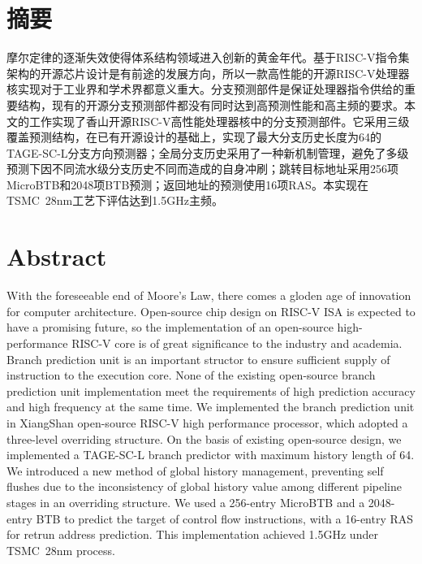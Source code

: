 \maketitle%
\intobmk\chapter*{摘\quad 要}%
\setcounter{page}{1}%
摩尔定律的逐渐失效使得体系结构领域进入创新的黄金年代\cite{hennessy2019new}。基于RISC-V指令集架构的开源芯片设计是有前途的发展方向，所以一款高性能的开源RISC-V处理器核实现对于工业界和学术界都意义重大。分支预测部件是保证处理器指令供给的重要结构，现有的开源分支预测部件都没有同时达到高预测性能和高主频的要求。本文的工作实现了香山开源RISC-V高性能处理器核中的分支预测部件。它采用三级覆盖预测结构，在已有开源设计的基础上，实现了最大分支历史长度为64的TAGE-SC-L分支方向预测器\cite{seznec2014tage}；全局分支历史采用了一种新机制管理，避免了多级预测下因不同流水级分支历史不同而造成的自身冲刷；跳转目标地址采用256项MicroBTB和2048项BTB预测；返回地址的预测使用16项RAS。本实现在TSMC~28nm工艺下评估达到1.5GHz主频。

\intobmk\chapter*{Abstract}%
With the foreseeable end of Moore's Law, there comes a gloden age of innovation for computer architecture\cite{hennessy2019new}. Open-source chip design on RISC-V ISA is expected to have a promising future, so the implementation of an open-source high-performance RISC-V core is of great significance to the industry and academia. Branch prediction unit is an important structor to ensure sufficient supply of instruction to the execution core. None of the existing open-source branch prediction unit implementation meet the requirements of high prediction accuracy and high frequency at the same time. We implemented the branch prediction unit in XiangShan open-source RISC-V high performance processor, which adopted a three-level overriding structure. On the basis of existing open-source design, we implemented a TAGE-SC-L branch predictor\cite{seznec2014tage} with maximum history length of 64. We introduced a new method of global history management, preventing self flushes due to the inconsistency of global history value among different pipeline stages in an overriding structure. We used a 256-entry MicroBTB and a 2048-entry BTB to predict the target of control flow instructions, with a 16-entry RAS for retrun address prediction. This implementation achieved 1.5GHz under TSMC~28nm process. 

